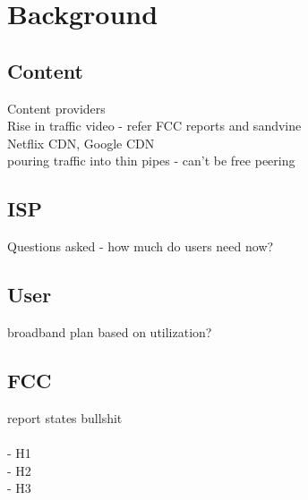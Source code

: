 \section{Background}
\label{sec:background}

\subsection{Content}
Content providers\\
Rise in traffic video - refer FCC reports and sandvine\\
Netflix CDN, Google CDN\\
pouring traffic into thin pipes - can't be free peering

\subsection{ISP}
Questions asked - how much do users need now?

\subsection{User}
broadband plan based on utilization?

\subsection{FCC}
report states \cite{fcc2014measuring-broadband} bullshit \\
\\
- H1\\
- H2\\
- H3